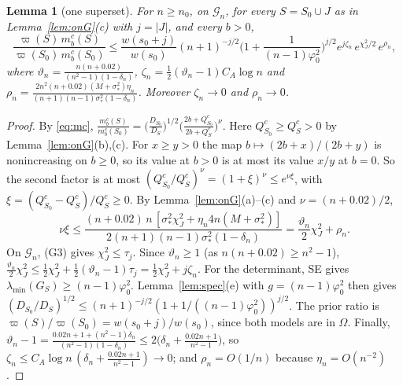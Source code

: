 \documentclass[11pt]{article}
\newtheorem{lemma}[theorem]{Lemma}
\theoremstyle{remark}
\newcommand{\vp}{\varpi}
\newcommand{\Om}{\Omega}
\newcommand{\G}{\mathcal G}
\begin{document}
\begin{lemma}[one superset]\label{lem:one}
For $n\ge n_0$, on $\G_n$, for every $S=S_0\cup J$ as in Lemma~\ref{lem:onG}(c) with $j=|J|$, and every $b>0$,
\[
\frac{\vp(S)\,m^c_b(S)}{\vp(S_0)\,m^c_b(S_0)}\le\frac{w(s_0+j)}{w(s_0)}(n+1)^{-j/2}\Big(1+\frac1{(n-1)\varphi_0^2}\Big)^{j/2}e^{j\zeta_n}\,e^{\chi^2_J/2}\,e^{\rho_n},
\]
where $\vartheta_n=\frac{n(n+0.02)}{(n^2-1)(1-\delta_n)}$, $\zeta_n=\frac12(\vartheta_n-1)C_A\log n$ and $\rho_n=\frac{2n^2(n+0.02)(M+\sigma_*^2)\eta_n}{(n+1)(n-1)\sigma_*^2(1-\delta_n)}$. Moreover $\zeta_n\to0$ and $\rho_n\to0$.
\end{lemma}
\begin{proof}
By \eqref{eq:mc}, $\frac{m^c_b(S)}{m^c_b(S_0)}=\big(\frac{D_{S_0}}{D_S}\big)^{1/2}\big(\frac{2b+Q^c_{S_0}}{2b+Q^c_S}\big)^\nu$. Here $Q^c_{S_0}\ge Q^c_S>0$ by Lemma~\ref{lem:onG}(b),(c). For $x\ge y>0$ the map $b\mapsto(2b+x)/(2b+y)$ is nonincreasing on $b\ge0$, so its value at $b>0$ is at most its value $x/y$ at $b=0$. So the second factor is at most $(Q^c_{S_0}/Q^c_S)^\nu=(1+\xi)^\nu\le e^{\nu\xi}$, with $\xi=(Q^c_{S_0}-Q^c_S)/Q^c_S\ge0$. By Lemma~\ref{lem:onG}(a)--(c) and $\nu=(n+0.02)/2$,
\[
\nu\xi\le\frac{(n+0.02)\,n\,[\sigma_*^2\chi^2_J+\eta_n4n(M+\sigma_*^2)]}{2(n+1)(n-1)\sigma_*^2(1-\delta_n)}=\frac{\vartheta_n}{2}\chi^2_J+\rho_n .
\]
On $\G_n$, (G3) gives $\chi^2_J\le\tau_j$. Since $\vartheta_n\ge1$ (as $n(n+0.02)\ge n^2-1$), $\frac{\vartheta_n}2\chi^2_J\le\frac12\chi^2_J+\frac12(\vartheta_n-1)\tau_j=\frac12\chi^2_J+j\zeta_n$. For the determinant, SE gives $\lambda_{\min}(G_S)\ge(n-1)\varphi_0^2$. Lemma~\ref{lem:spec}(e) with $g=(n-1)\varphi_0^2$ then gives $(D_{S_0}/D_S)^{1/2}\le(n+1)^{-j/2}(1+1/((n-1)\varphi_0^2))^{j/2}$. The prior ratio is $\vp(S)/\vp(S_0)=w(s_0+j)/w(s_0)$, since both models are in $\Om$. Finally,
$\vartheta_n-1=\frac{0.02n+1+(n^2-1)\delta_n}{(n^2-1)(1-\delta_n)}\le2\big(\delta_n+\frac{0.02n+1}{n^2-1}\big)$, so $\zeta_n\le C_A\log n\,(\delta_n+\frac{0.02n+1}{n^2-1})\to0$; and $\rho_n=O(1/n)$ because $\eta_n=O(n^{-2})$.
\end{proof}
\end{document}
